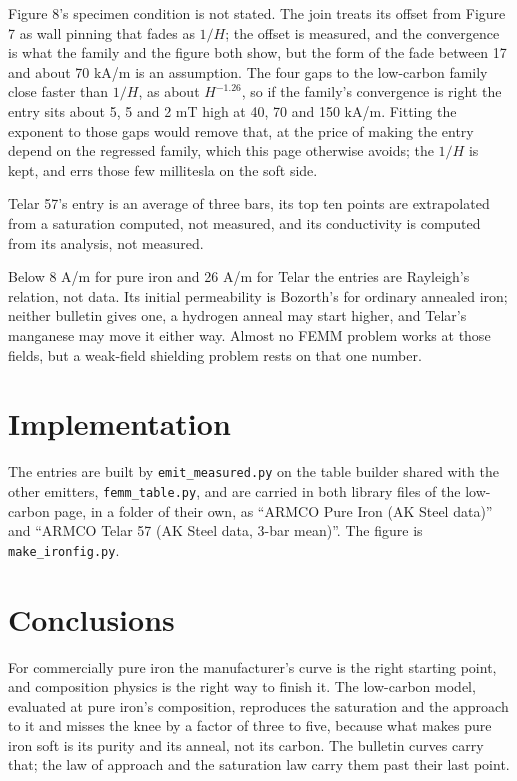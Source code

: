 \documentclass[
  11pt,
]{article}
\begin{document}
Figure 8's specimen condition is not stated. The join treats its offset from Figure 7 as wall pinning that fades as \(1/H\); the offset is measured, and the convergence is what the family and the figure both show, but the form of the fade between 17 and about 70 kA/m is an assumption. The four gaps to the low-carbon family close faster than \(1/H\), as about \(H^{-1.26}\), so if the family's convergence is right the entry sits about 5, 5 and 2 mT high at 40, 70 and 150 kA/m. Fitting the exponent to those gaps would remove that, at the price of making the entry depend on the regressed family, which this page otherwise avoids; the \(1/H\) is kept, and errs those few millitesla on the soft side.

Telar 57's entry is an average of three bars, its top ten points are extrapolated from a saturation computed, not measured, and its conductivity is computed from its analysis, not measured.

Below 8 A/m for pure iron and 26 A/m for Telar the entries are Rayleigh's relation, not data. Its initial permeability is Bozorth's for ordinary annealed iron; neither bulletin gives one, a hydrogen anneal may start higher, and Telar's manganese may move it either way. Almost no FEMM problem works at those fields, but a weak-field shielding problem rests on that one number.

\section{Implementation}\label{implementation}

The entries are built by \texttt{emit\_measured.py} on the table builder shared with the other emitters, \texttt{femm\_table.py}, and are carried in both library files of the low-carbon page, in a folder of their own, as ``ARMCO Pure Iron (AK Steel data)'' and ``ARMCO Telar 57 (AK Steel data, 3-bar mean)''. The figure is \texttt{make\_ironfig.py}.

\section{Conclusions}\label{conclusions}

For commercially pure iron the manufacturer's curve is the right starting point, and composition physics is the right way to finish it. The low-carbon model, evaluated at pure iron's composition, reproduces the saturation and the approach to it and misses the knee by a factor of three to five, because what makes pure iron soft is its purity and its anneal, not its carbon. The bulletin curves carry that; the law of approach and the saturation law carry them past their last point.
\end{document}
